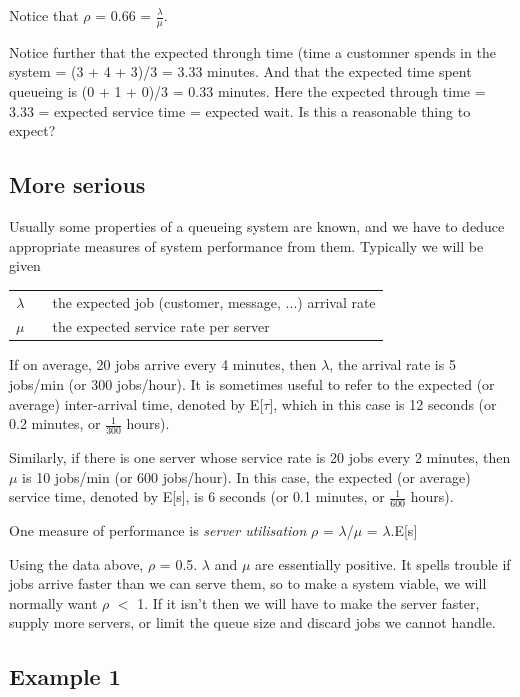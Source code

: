 \documentclass[12pt,fleqn]{report}
\begin{document}
Notice that $\rho$ = 0.66 = $\frac{\lambda}{\mu}$.

Notice further that the expected through time (time a customner spends
in the system = (3 + 4 + 3)/3 = 3.33 minutes.
And that the expected time spent queueing is (0 + 1 + 0)/3 = 0.33
minutes.
Here the expected through time = 3.33 = expected service time = expected
wait. Is this a reasonable thing to expect?

\subsection{More serious}

Usually some properties of a queueing system are known,
and we have to deduce appropriate measures of system 
performance from them.
Typically we will be given 

\begin{tabular}{r c l}
$\lambda$ &  & the expected job (customer, message, ...) arrival rate \\
$\mu$     &  & the expected service rate per server           \\
\end{tabular}

\noindent
If on average, 20 jobs arrive every 4 minutes, 
then $\lambda$, the arrival rate is 5 jobs/min (or 300 jobs/hour).
It is sometimes useful to refer to the expected (or average)
inter-arrival time, denoted by E[$\tau$], which in this case is 
12 seconds (or 0.2 minutes, or $\frac{1}{300}$ hours).

Similarly, if there is one server whose service rate is 
20 jobs every 2 minutes, then $\mu$ is 10 jobs/min (or 600 jobs/hour).
In this case, the expected (or average) service time, denoted by E[s],
is 6 seconds (or 0.1 minutes, or $\frac{1}{600}$ hours).

One measure of performance is {\it server utilisation}
 $\rho$ = $\lambda$/$\mu$ =  $\lambda$.E[s]

Using the data above, $\rho$ =  0.5.
$\lambda$ and $\mu$ are essentially positive.
It spells trouble if jobs arrive faster than we can serve them,
so to make a system viable, we will normally want $\rho$ $<$ 1.
If it isn't then we will have to make the server faster,
supply more servers, or limit the queue size and
discard jobs we cannot handle.

\subsection*{Example 1}
\end{document}
